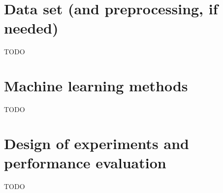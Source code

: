 \documentclass[a4paper]{article}
\begin{document}
\section{Data set (and preprocessing, if needed)}

TODO

\section{Machine learning methods}

TODO

\section{Design of experiments and performance evaluation}

TODO



%
\end{document}

